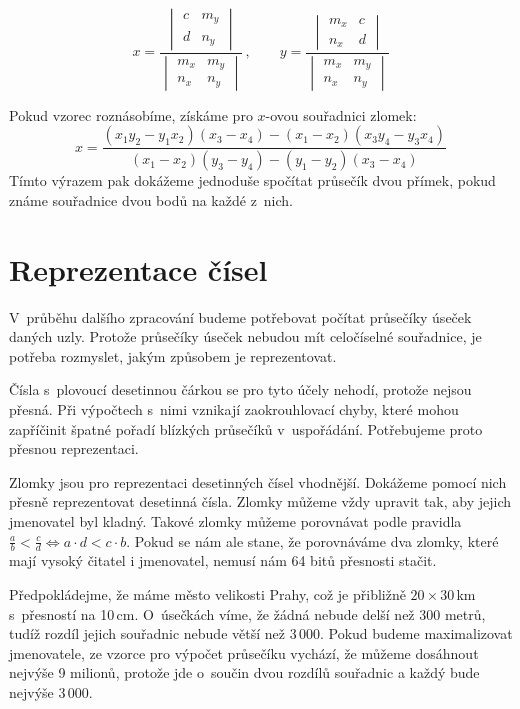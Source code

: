 $$x = \frac{
	\begin{vmatrix}
		c & m_y \\
		d & n_y
	\end{vmatrix}
}
{
	\begin{vmatrix} 
		m_x & m_y \\
		n_x & n_y 
	\end{vmatrix}
}\,\!,\qquad
y = \frac{
	\begin{vmatrix}
		m_x & c \\
		n_x & d
	\end{vmatrix}
}
{
	\begin{vmatrix} 
		m_x & m_y \\
		n_x & n_y 
	\end{vmatrix}
}
$$

Pokud vzorec roznásobíme, získáme pro $x$-ovou souřadnici zlomek:
$$
x=\frac{(x_1 y_2-y_1 x_2)(x_3-x_4)-(x_1-x_2)(x_3 y_4-y_3 x_4)}
{(x_1-x_2)(y_3-y_4)-(y_1-y_2)(x_3-x_4)}$$
Tímto výrazem pak dokážeme jednoduše spočítat průsečík dvou přímek, pokud známe
souřadnice dvou bodů na každé z~nich.

\section{Reprezentace čísel}
V~průběhu dalšího zpracování budeme potřebovat počítat průsečíky úseček daných
uzly. Protože průsečíky úseček nebudou mít celočíselné souřadnice, je potřeba
rozmyslet, jakým způsobem je reprezentovat.

{\tuc Čísla s~plovoucí desetinnou čárkou} se pro tyto účely nehodí, protože
nejsou přesná. Při výpočtech s~nimi vznikají zaokrouhlovací chyby, které mohou
zapříčinit špatné pořadí blízkých průsečíků v~uspořádání. Potřebujeme proto
přesnou reprezentaci.

{\tuc Zlomky} jsou pro reprezentaci desetinných čísel vhodnější. Dokážeme pomocí
nich přesně reprezentovat desetinná čísla. Zlomky můžeme vždy
upravit tak, aby jejich jmenovatel byl kladný.  Takové zlomky můžeme porovnávat
podle pravidla $\frac{a}{b} < \frac{c}{d} \Leftrightarrow a\cdot d < c\cdot b $. 
Pokud se nám ale stane, že porovnáváme dva zlomky, které mají vysoký čitatel i
jmenovatel, nemusí nám 64 bitů přesnosti stačit.

Předpokládejme, že máme město velikosti Prahy, což je přibližně $20 \times
30$\,km s~přesností na 10\,cm. O~úsečkách víme, že žádná nebude delší než 300
metrů, tudíž rozdíl jejich souřadnic nebude větší než 3\,000. Pokud budeme
maximalizovat jmenovatele, ze vzorce pro výpočet průsečíku vychází, že můžeme
dosáhnout nejvýše 9 milionů, protože jde o~součin dvou rozdílů souřadnic a každý
bude nejvýše 3\,000.

